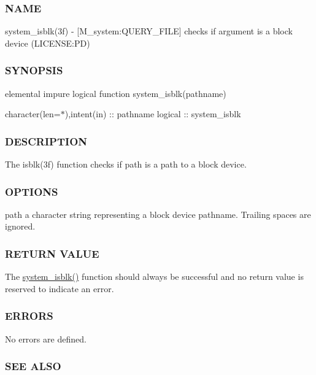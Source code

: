 \subsubsection*{N\+A\+ME}

system\+\_\+isblk(3f) -\/ \mbox{[}M\+\_\+system\+:Q\+U\+E\+R\+Y\+\_\+\+F\+I\+LE\mbox{]} checks if argument is a block device (L\+I\+C\+E\+N\+SE\+:PD) 

\subsubsection*{S\+Y\+N\+O\+P\+S\+IS}

elemental impure logical function system\+\_\+isblk(pathname)

character(len=$\ast$),intent(in) \+:\+: pathname logical \+:\+: system\+\_\+isblk

\subsubsection*{D\+E\+S\+C\+R\+I\+P\+T\+I\+ON}

The isblk(3f) function checks if path is a path to a block device.

\subsubsection*{O\+P\+T\+I\+O\+NS}

path a character string representing a block device pathname. Trailing spaces are ignored.

\subsubsection*{R\+E\+T\+U\+RN V\+A\+L\+UE}

The \mbox{\hyperlink{namespacem__system_a1294b8d8b4910261c0a0991bf668ab67}{system\+\_\+isblk()}} function should always be successful and no return value is reserved to indicate an error.

\subsubsection*{E\+R\+R\+O\+RS}

No errors are defined.

\subsubsection*{S\+EE A\+L\+SO}

